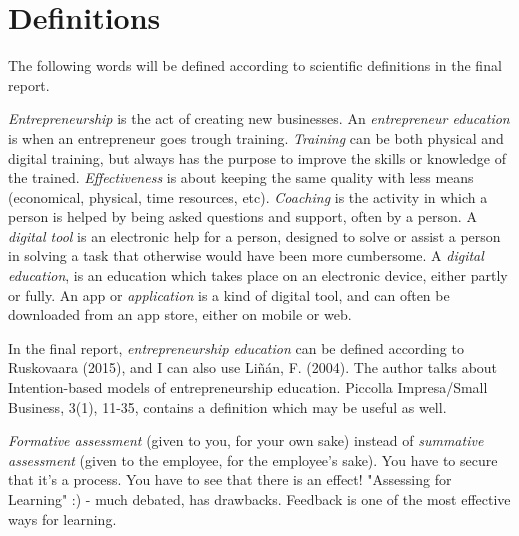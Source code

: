\section{Definitions} %

The following words will be defined according to scientific definitions in the final report.

\textit{Entrepreneurship} is the act of creating new businesses. An \textit{entrepreneur education} is when an entrepreneur goes trough training. 
\textit{Training} can be both physical and digital training, but always has the purpose to improve the skills or knowledge of the trained.
\textit{Effectiveness} is about keeping the same quality with less means (economical, physical, time resources, etc).
\textit{Coaching} is the activity in which a person is helped by being asked questions and support, often by a person.
A {\textit{digital tool}} is an electronic help for a person, designed to solve or assist a person in solving a task that otherwise would have been more cumbersome. A \textit{digital education}, is an education which takes place on an electronic device, either partly or fully.
An {app} or \textit{application} is a kind of digital tool, and can often be downloaded from an app store, either on mobile or web.

In the final report, \textit{entrepreneurship education} can be defined according to Ruskovaara (2015), and I can also use Liñán, F. (2004). The author talks about Intention-based models of entrepreneurship education. Piccolla Impresa/Small Business, 3(1), 11-35, contains a definition which may be useful as well.


\textit{Formative assessment} (given to you, for your own sake) instead of \textit{summative assessment} (given to the employee, for the employee's sake). You have to secure that it's a process. You have to see that there is an effect! "Assessing for Learning" :) - much debated, has drawbacks. Feedback is one of the most effective ways for learning.